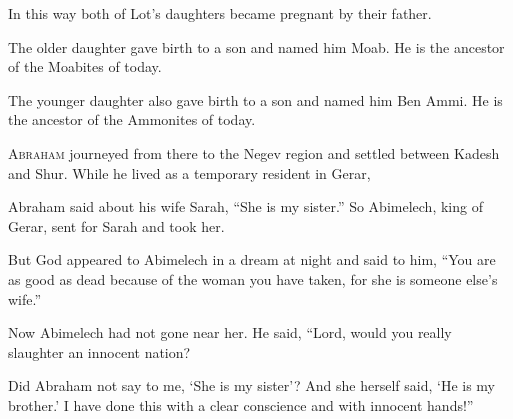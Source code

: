 \begin{scripture}
 In this way both of Lot's daughters became pregnant by their father.
 The older daughter gave birth to a son and named him Moab. He is the ancestor of the Moabites of today.
 The younger daughter also gave birth to a son and named him Ben Ammi. He is the ancestor of the Ammonites of today.

 \allowchapbreak\hypertarget{ch-genesis-20}{}\lettrine[lines=5]{\color{pentateuch}A}{\textsc{braham}} journeyed from there to the Negev region and settled between Kadesh and Shur. While he lived as a temporary resident in Gerar,\everypar{}
 Abraham said about his wife Sarah, ``She is my sister.'' So Abimelech, king of Gerar, sent for Sarah and took her.
\everypar{}

 But God appeared to Abimelech in a dream at night and said to him, ``You are as good as dead because of the woman you have taken, for she is someone else's wife.''
\everypar{}

 Now Abimelech had not gone near her. He said, ``Lord, would you really slaughter an innocent nation?
 Did Abraham not say to me, `She is my sister'? And she herself said, `He is my brother.' I have done this with a clear conscience and with innocent hands!''
\everypar{}


\end{scripture}
